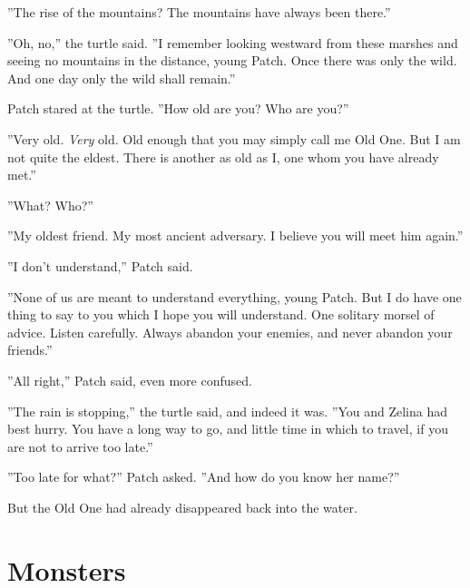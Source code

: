 \documentclass[12pt]{book}
\begin{document}
 ''The rise of the mountains? The mountains have always been there.''\par
 ''Oh, no,'' the turtle said. ''I remember looking westward from these marshes and seeing no mountains in the distance, young Patch. Once there was only the wild. And one day only the wild shall remain.''\par
 Patch stared at the turtle. ''How old are you? Who are you?''\par
 ''Very old. {\it Very} old. Old enough that you may simply call me Old One. But I am not quite the eldest. There is another as old as I, one whom you have already met.''\par
 ''What? Who?''\par
 ''My oldest friend. My most ancient adversary. I believe you will meet him again.''\par
 ''I don't understand,'' Patch said.\par
 ''None of us are meant to understand everything, young Patch. But I do have one thing to say to you which I hope you will understand. One solitary morsel of advice. Listen carefully. Always abandon your enemies, and never abandon your friends.''\par
 ''All right,'' Patch said, even more confused.\par
 ''The rain is stopping,'' the turtle said, and indeed it was. ''You and Zelina had best hurry. You have a long way to go, and little time in which to travel, if you are not to arrive too late.''\par
 ''Too late for what?'' Patch asked. ''And how do you know her name?''\par
 But the Old One had already disappeared back into the water.\par

\section{Monsters}
\end{document}
